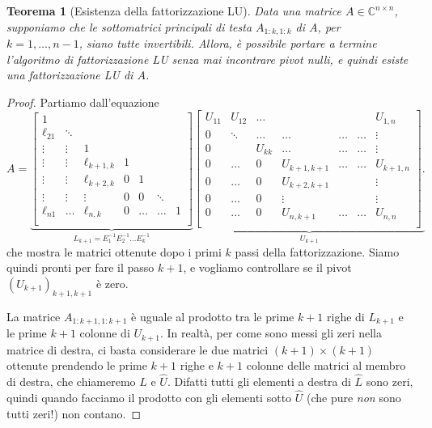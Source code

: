 \documentclass[a4paper]{report}
\newtheorem{theorem}{Teorema}[chapter]
\theoremstyle{definiton}
\theoremstyle{remark}
\begin{document}
\begin{theorem}[Esistenza della fattorizzazione LU]
Data una matrice $A\in\mathbb{C}^{n\times n}$, supponiamo che le sottomatrici principali di testa $A_{1:k,1:k}$ di $A$, per $k=1,\dots,n-1$, siano tutte invertibili. Allora, è possibile portare a termine l'algoritmo di fattorizzazione LU senza mai incontrare pivot nulli, e quindi esiste una fattorizzazione LU di $A$.
\end{theorem}
\begin{proof}
Partiamo dall'equazione
\begin{equation} \label{fattLU}
A = 
\underbrace{
\begin{bmatrix}
    1\\
    \ell_{21} & \ddots\\
    \vdots & \vdots & 1\\
    \vdots & \vdots & \ell_{k+1,k} & 1\\
    \vdots & \vdots & \ell_{k+2,k} & 0 & 1\\
    \vdots & \vdots & \vdots & 0 & 0 & \ddots\\
    \ell_{n1} & \dots & \ell_{n,k} & 0 & \dots & \dots & 1\\
\end{bmatrix}
}_{L_{k+1} = E_1^{-1}E_2^{-1}\dots E_k^{-1}}
\underbrace{
\begin{bmatrix}
    U_{11} & U_{12} & \dots & & & &U_{1,n} \\
    0 & \ddots  & \dots & \dots & \dots &\dots & \vdots\\
    0 & & U_{kk} & \dots & \dots & \dots & \vdots\\
    0 & \dots & 0 & U_{k+1,k+1} & \dots & \dots & U_{k+1,n}\\
    0 & \dots & 0 & U_{k+2,k+1} & & &\vdots\\
    0 & \dots & 0 & \vdots & & & \vdots\\
    0 & \dots & 0 & U_{n,k+1} & \dots & \dots & U_{n,n}\\
\end{bmatrix}.
}_{U_{k+1}}
\end{equation}
che mostra le matrici ottenute dopo i primi $k$ passi della fattorizzazione. Siamo quindi pronti per fare il passo $k+1$, e vogliamo controllare se il pivot $(U_{k+1})_{k+1,k+1}$ è zero.

La matrice $A_{1:k+1,1:k+1}$ è uguale al prodotto tra le prime $k+1$ righe di $L_{k+1}$ e le prime $k+1$ colonne di $U_{k+1}$. In realtà, per come sono messi gli zeri nella matrice di destra, ci basta considerare le due matrici $(k+1)\times(k+1)$ ottenute prendendo le prime $k+1$ righe e $k+1$ colonne delle matrici al membro di destra, che chiameremo $\hat{L}$ e $\hat{U}$. Difatti tutti gli elementi a destra di $\hat{L}$ sono zeri, quindi quando facciamo il prodotto con gli elementi sotto $\hat{U}$ (che pure \emph{non} sono tutti zeri!) non contano.


\end{proof}
\end{document}
